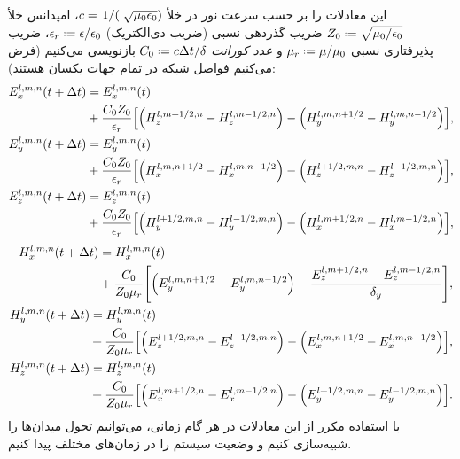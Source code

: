 \documentclass[12pt,a4paper]{article}
\newcommand*{\defeq}{\mathrel{\vcenter{\baselineskip0.5ex \lineskiplimit0pt
						\hbox{\scriptsize.}\hbox{\scriptsize.}}}
						=}
\begin{document}
	این معادلات را بر حسب سرعت نور در خلأ $c=\flatfrac{1}(\sqrt{\mu_0\epsilon_0})$، امپدانس خلأ $Z_0\defeq\sqrt{\mu_0/\epsilon_0}$
	ضریب گذردهی نسبی (ضریب دی‌الکتریک) $\epsilon_r\defeq\epsilon/\epsilon_0 $، ضریب پذیرفتاری نسبی $\mu_r\defeq\mu/\mu_0 $ و
	\emph{عدد کورانت} $C_0\defeq c\Delta{t}/\delta$ بازنویسی می‌کنیم (فرض می‌کنیم فواصل شبکه در تمام جهات یکسان هستند):
	\begin{align}
		\begin{split}
			E_x^{l,m,n}(t + \Delta{t}) &= E_x^{l,m,n}(t) \\
			&+ \frac{C_0 Z_0}{\epsilon_r}\qty[\qty(H_z^{l,m+1/2,n}-H_z^{l,m-1/2,n})-\qty(H_y^{l,m,n+1/2}-H_y^{l,m,n-1/2})],
		\end{split} \\
		\begin{split}
			E_y^{l,m,n}(t + \Delta{t}) &= E_y^{l,m,n}(t) \\
			&+ \frac{C_0 Z_0}{\epsilon_r}\qty[\qty(H_x^{l,m,n+1/2}-H_x^{l,m,n-1/2})-\qty(H_z^{l+1/2,m,n}-H_z^{l-1/2,m,n})], 
		\end{split}\\
		\begin{split}
			E_z^{l,m,n}(t + \Delta{t}) &= E_z^{l,m,n}(t) \\
			&+ \frac{C_0 Z_0}{\epsilon_r}\qty[\qty(H_y^{l+1/2,m,n}-H_y^{l-1/2,m,n})-\qty(H_x^{l,m+1/2,n}-H_x^{l,m-1/2,n})],
		\end{split}
	\end{align}
	\begin{align}
		\begin{split}
			H_x^{l,m,n}(t + \Delta{t}) &= H_x^{l,m,n}(t) \\
			&+ \frac{C_0}{Z_0\mu_r}\qty[\qty(E_y^{l,m,n+1/2}-E_y^{l,m,n-1/2})-\frac{E_z^{l,m+1/2,n}-E_z^{l,m-1/2,n}}{\delta_y}],
		\end{split}\\
		\begin{split}
			H_y^{l,m,n}(t + \Delta{t}) &= H_y^{l,m,n}(t) \\
			&+ \frac{C_0}{Z_0\mu_r}\qty[\qty(E_z^{l+1/2,m,n}-E_z^{l-1/2,m,n})-\qty(E_x^{l,m,n+1/2}-E_x^{l,m,n-1/2})],
		\end{split}\\
		\begin{split}
			H_z^{l,m,n}(t + \Delta{t}) &= H_z^{l,m,n}(t) \\
			&+ \frac{C_0}{Z_0\mu_r}\qty[\qty(E_x^{l,m+1/2,n}-E_x^{l,m-1/2,n})-\qty(E_y^{l+1/2,m,n}-E_y^{l-1/2,m,n})].
		\end{split}
	\end{align}
	با استفاده مکرر از این معادلات در هر گام زمانی، می‌توانیم تحول میدان‌ها را شبیه‌سازی کنیم و وضعیت سیستم را در زمان‌های مختلف پیدا کنیم.
	
\end{document}
